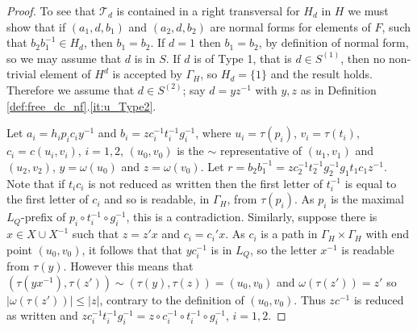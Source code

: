 \documentclass[a4paper,12pt]{article}
\newcommand{\G}{\Gamma }
\renewcommand{\t}{\tau }
\newcommand{\w}{\omega }
\numberwithin{equation}{section}
\numberwithin{figure}{section}
\newcommand{\cT}{\mathcal{T}}
\begin{document}
{\begin{proof}
To see that  $\cT_d$ is contained in a right transversal for $H_d$ in $H$
we must show that if $(a_1,d,b_1)$ and $(a_2,d,b_2)$ are normal forms for elements of $F$, such that $b_2b_1^{-1}\in H_d$,
then $b_1=b_2$. If $d=1$ then $b_1=b_2$, by definition of normal form, so we may assume that $d$ is in $S$. If 
$d$ is of Type 1, that is $d\in S^{(1)}$, then no non-trivial element of $H^d$ is accepted by $\G_H$, so $H_d=\{1\}$ and 
the result holds. Therefore we assume that $d\in S^{(2)}$; say $d=yz^{-1}$ with $y,z$ as in Definition 
\ref{def:free_dc_nf}.\ref{it:u_Type2}.  

Let $a_i=h_ip_ic_iy^{-1}$ and $b_i=zc_i^{-1}t_i^{-1}g_i^{-1}$, where $u_i=\t(p_i)$,  $v_i=\t(t_i)$, $c_i=c(u_i,v_i)$, $i=1,2$, 
$(u_0,v_0)$ is the $\sim$ representative of $(u_1,v_1)$ and $(u_2,v_2)$, $y=\w(u_0)$ and 
 $z=\w(v_0)$. Let $r=b_2b_1^{-1}=zc_2^{-1}t_2^{-1}g_2^{-1}g_1t_1c_1z^{-1}$. Note that if $t_ic_i$ is not reduced as written
then the first letter of $t_i^{-1}$ is equal to the first letter of $c_i$ and so is readable, in $\G_H$, from $\t(p_i)$. As
$p_i$ is the maximal $L_Q$-prefix of $p_i\circ t_i^{-1}\circ g_i^{-1}$, this is a contradiction. Similarly, suppose there
is $x\in X\cup X^{-1}$ such that $z=z'x$ and 
$c_i=c_i'x$. As $c_i$ is a path in $\G_H\times \G_H$ with end point $(u_0,v_0)$, it follows that  that $yc_i^{-1}$ is in $L_Q$, 
so the letter $x^{-1}$ is readable from $\t(y)$. However  this means that 
$(\t(yx^{-1}),\t(z'))\sim (\t(y),\t(z))=(u_0,v_0)$ and $\w(\t(z'))=z'$ so $|\w(\t(z'))|\le |z|$, contrary to the definition
of $(u_0,v_0)$.  Thus $zc^{-1}$ is reduced as written and 
$zc_i^{-1}t_i^{-1}g_i^{-1}=z\circ c_i^{-1}\circ t_i^{-1}\circ g_i^{-1}$, $i=1,2$. 


\end{proof}}
\end{document}
